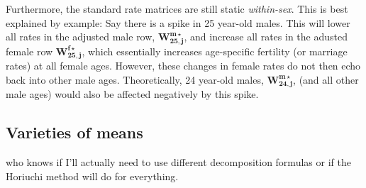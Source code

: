 \documentclass[reqno,12pt,oneside,a4paper]{report} %
\theoremstyle{plain}
\theoremstyle{definition}
\theoremstyle{remark}
\numberwithin{theorem}{chapter}     %
\begin{document}
Furthermore, the standard rate matrices are still static \textit{within-sex}. This is best explained by example: Say there is a spike in 25 year-old males. This will lower all rates in the adjusted male row, $\bm{W_{25,j}^{m\star}}$, and increase all rates in the adusted female row $\bm{W_{25,j}^{f\star}}$, which essentially increases age-specific fertility (or marriage rates) at all female ages. However, these changes in female rates do not then echo back into other male ages. Theoretically, 24 year-old males, $\bm{W_{24,j}^{m\star}}$, (and all other male ages) would also be affected negatively by this spike. 

\subsection{Varieties of means}



\citet{keyfitz1972mathematics}

\startappendices


 \label{app:Appendix1}
% 
who knows if I'll actually need to use different decomposition formulas or if the Horiuchi method will do for everything.
 
\startbibliography
 \begin{singlespace} %
 \end{singlespace}

%
\end{document}

